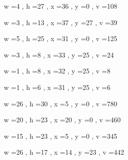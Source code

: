 \documentclass[11pt]{article}
\begin{document}
w =4 , h =27 , x =36 , y =0 , v =108
\par
w =3 , h =13 , x =37 , y =27 , v =39
\par
w =5 , h =25 , x =31 , y =0 , v =125
\par
w =3 , h =8 , x =33 , y =25 , v =24
\par
w =1 , h =8 , x =32 , y =25 , v =8
\par
w =1 , h =6 , x =31 , y =25 , v =6
\par
w =26 , h =30 , x =5 , y =0 , v =780
\par
\newpage




w =20 , h =23 , x =20 , y =0 , v =460
\par
w =15 , h =23 , x =5 , y =0 , v =345
\par
w =26 , h =17 , x =14 , y =23 , v =442
\par
\newpage
\end{document}
